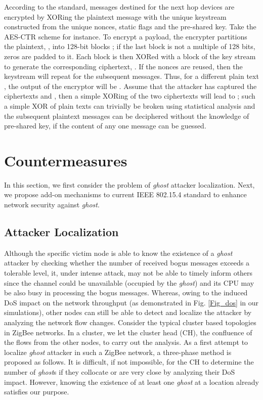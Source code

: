 \documentclass[10pt,journal,cspaper,compsoc]{IEEEtran}
\begin{document}
According to the standard, messages destined for the next hop devices are encrypted by XORing the plaintext message  with the unique keystream  constructed from the unique nonces, static flags and the pre-shared key. Take the AES-CTR scheme for instance. To encrypt a payload, the encrypter partitions the plaintext, , into  128-bit blocks ; if the last block is not a multiple of 128 bits, zeros are padded to it. Each  block is then XORed with a block of the key stream  to generate the corresponding ciphertext, . If the nonces are reused, then the keystream will repeat for the subsequent messages. Thus, for a different plain text , the output of the encryptor will be . Assume that the attacker has captured the ciphertexts  and , then a simple XORing of the two ciphertexts will lead to ; such a simple XOR of plain texts can trivially be broken using statistical analysis and the subsequent plaintext messages can be deciphered without the knowledge of pre-shared key,  if the content of any one message can be guessed.

\section{Countermeasures}\label{sec:countermeasures}
In this section, we first consider the problem of {\em ghost} attacker localization. Next, we propose add-on mechanisms to current IEEE 802.15.4 standard to enhance network security against {\em ghost}.

\subsection{Attacker Localization}\label{sec:localizaiton}
Although the specific victim node is able to know the existence of a {\em ghost} attacker by checking whether the number of received bogus messages exceeds a tolerable level, it, under intense attack, may not be able to timely inform others since the channel could be unavailable (occupied by the {\em ghost}) and its CPU may be also busy in processing the bogus messages. Whereas, owing to the induced DoS impact on the network throughput (as demonstrated in Fig. \ref{Fig_dos} in our simulations), other nodes can still be able to detect and localize the attacker by analyzing the network flow changes. Consider the typical cluster based topologies in ZigBee networks. In a cluster, we let the cluster head (CH), the confluence of the flows from the other nodes, to carry out the analysis. As a first attempt to localize {\em ghost} attacker in such a ZigBee network, a three-phase method is proposed as follows. It is difficult, if not impossible, for the CH to determine the number of {\em ghost}s if they collocate or are very close by analyzing their DoS impact. However, knowing the existence of at least one {\em ghost} at a location already satisfies our purpose.
\end{document}

